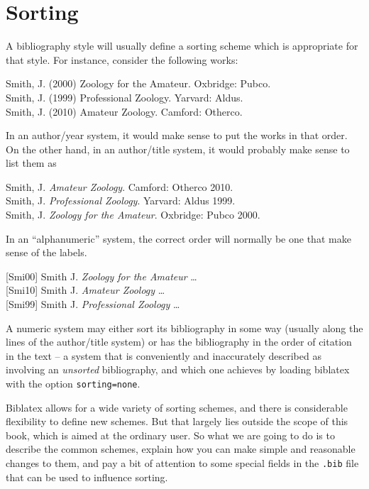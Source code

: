 \chapter{Sorting}\label{ch:sorting}

A bibliography style will usually define a sorting scheme which is
appropriate for that style. For instance, consider the following works:

\medskip
\colorbox{red!40}%
    {Smith, J. (2000) Zoology for the Amateur. Oxbridge: Pubco.}\\
\colorbox{green!40}%
    {Smith, J. (1999) Professional Zoology. Yarvard: Aldus.}\\
\colorbox{blue!40}%
    {Smith, J. (2010) Amateur Zoology. Camford: Otherco.}
\medskip

In an author/year system, it would make sense to put the works in that
order. On the other hand, in an author/title system, it would probably
make sense to list them as

\medskip
\colorbox{blue!40}%
    {Smith, J. \emph{Amateur Zoology}. Camford: Otherco 2010.}\\
\colorbox{green!40}%
    {Smith, J. \emph{Professional Zoology}. Yarvard: Aldus 1999.}\\
\colorbox{red!40}%
    {Smith, J. \emph{Zoology for the Amateur}. Oxbridge: Pubco 2000.}
\medskip

In an ``alphanumeric'' system, the correct order will normally be one
that make sense of the labels.

\medskip
\colorbox{red!40}
    {{[}Smi00{]} Smith J. \emph{Zoology for the Amateur} \ldots{}}\\
\colorbox{blue!40}
    {{[}Smi10{]} Smith J. \emph{Amateur Zoology} \ldots{}}\\
\colorbox{green!40}
    {{[}Smi99{]} Smith J. \emph{Professional Zoology} \ldots{}}
\medskip

A numeric system may either sort its bibliography in some way (usually
along the lines of the author/title system) or has the bibliography in
the order of citation in the text -- a system that is conveniently and
inaccurately described as involving an \emph{unsorted} bibliography, and
which one achieves by loading biblatex with the option
\texttt{sorting=none}.

Biblatex allows for a wide variety of sorting schemes, and there is
considerable flexibility to define new schemes. But that largely lies
outside the scope of this book, which is aimed at the ordinary user. So
what we are going to do is to describe the common schemes, explain how
you can make simple and reasonable changes to them, and pay a bit of
attention to some special fields in the \texttt{.bib} file that can be
used to influence sorting.

